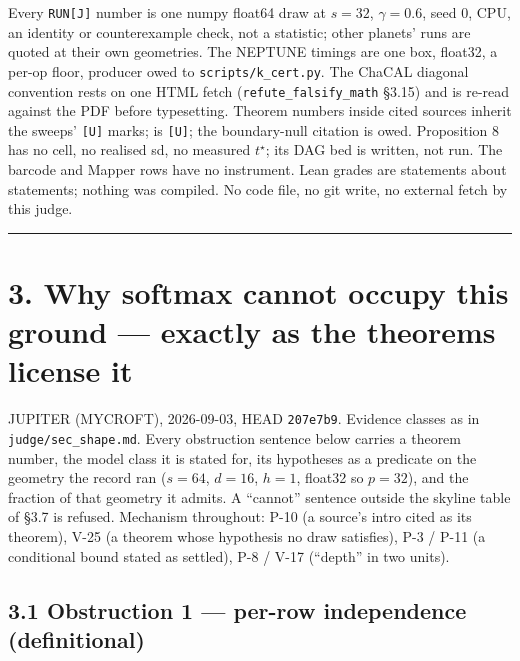 \documentclass[11pt,a4paper]{article}
\theoremstyle{plain}
\theoremstyle{definition}
\theoremstyle{remark}
\begin{document}
Every \texttt{RUN{[}J{]}} number is one numpy float64 draw at \(s=32\),
\(\gamma=0.6\), seed 0, CPU, an identity or counterexample check, not a
statistic; other planets' runs are quoted at their own geometries. The
NEPTUNE timings are one box, float32, a per-op floor, producer owed to
\texttt{scripts/k\_cert.py}. The ChaCAL diagonal convention rests on one
HTML fetch (\texttt{refute\_falsify\_math} §3.15) and is re-read against
the PDF before typesetting. Theorem numbers inside cited sources inherit
the sweeps' \texttt{{[}U{]}} marks; \citep{grinstead-1997-probability}
is \texttt{{[}U{]}}; the boundary-null citation is owed. Proposition 8
has no cell, no realised sd, no measured \(t^\star\); its DAG bed is
written, not run. The barcode and Mapper rows have no instrument. Lean
grades are statements about statements; nothing was compiled. No code
file, no git write, no external fetch by this judge.

\begin{center}\rule{0.5\linewidth}{0.5pt}\end{center}

\section{3. Why softmax cannot occupy this ground --- exactly as the
theorems license
it}\label{why-softmax-cannot-occupy-this-ground-exactly-as-the-theorems-license-it}

JUPITER (MYCROFT), 2026-09-03, HEAD \texttt{207e7b9}. Evidence classes
as in \texttt{judge/sec\_shape.md}. Every obstruction sentence below
carries a theorem number, the model class it is stated for, its
hypotheses as a predicate on the geometry the record ran (\(s=64\),
\(d=16\), \(h=1\), float32 so \(p=32\)), and the fraction of that
geometry it admits. A ``cannot'' sentence outside the skyline table of
§3.7 is refused. Mechanism throughout: P-10 (a source's intro cited as
its theorem), V-25 (a theorem whose hypothesis no draw satisfies), P-3 /
P-11 (a conditional bound stated as settled), P-8 / V-17 (``depth'' in
two units).

\subsection{3.1 Obstruction 1 --- per-row independence
(definitional)}\label{obstruction-1-per-row-independence-definitional}
\end{document}
